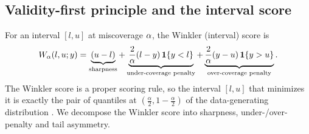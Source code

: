 \subsection{Validity-first principle and the interval score}
\label{sec:eval:validity}
%
%

For an interval $[l,u]$ at miscoverage $\alpha$, the Winkler (interval)
score \parencite{winkler1972} is
\begin{equation}
  W_\alpha(l,u;y) =
  \underbrace{(u-l)}_{\text{sharpness}} +
  \underbrace{\frac{2}{\alpha}(l-y)\,\mathbf{1}\{y<l\}}_{\text{under-coverage penalty}} +
  \underbrace{\frac{2}{\alpha}(y-u)\,\mathbf{1}\{y>u\}}_{\text{over-coverage penalty}} .
  \label{eq:winkler}
\end{equation}
The Winkler score is a proper scoring rule, so the interval $[l,u]$ that minimizes it is exactly the pair of quantiles at $(\frac{\alpha}{2},1-\frac{\alpha}{2})$ of the data-generating distribution \parencite{gneiting2007}. We decompose the Winkler score into sharpness, under-/over-penalty and tail asymmetry.


